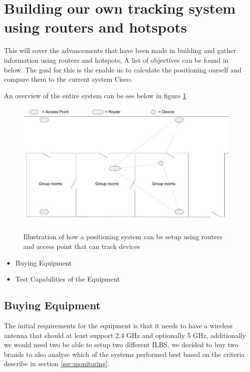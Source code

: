 \section{Building our own tracking system using routers and hotspots}
This will cover the advancements that have been made in building and gather information using routers and hotspots, A list of objectives can be found in below. The goal for this is the enable us to calculate the positioning ourself and compare them to the current system Cisco.

An overview of the entire system can be see below in figure \ref{fig:OwnSetup} 
\begin{figure}[H]
	\centering
	\includegraphics[scale=0.5]{graphics/Router-AccessPoint_Setup.pdf}
	\label{fig:OwnSetup}
	\caption{Illustration of how a positioning system can be setup using routers and access point that can track devices}
\end{figure}

\begin{itemize}
	\item Buying Equipment
	\item Test Capabilities of the Equipment
\end{itemize}

\subsection*{Buying Equipment}
The initial requirements for the equipment is that it needs to have a wireless antenna that should at least support 2.4 GHz and optionally 5 GHz, additionally we would need two be able to setup two different ILBS, we decided to buy two brands to also analyse which of the systems performed best based on the criteria describe in section \ref{sec:monitoring}.

